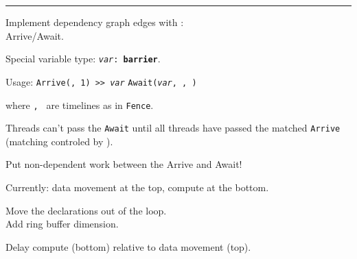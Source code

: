 \newpage
{}

{
\Large
\begin{tikzpicture}[node distance=0mm]





\end{tikzpicture}
}

\hrule

{\LARGE
Implement dependency graph edges with :\\Arrive/Await.
}

\newpage
{}

{\LARGE
Special variable type: \texttt{\textit{var}: \textbf{barrier}}.

Usage: \texttt{Arrive(, 1) >> \textit{var}} \hfill \texttt{Await(\textit{var}, , )}

where \texttt{, } are timelines as in \texttt{Fence}.

\hspace{5mm}

Threads can't pass the \texttt{Await} until all threads have passed the matched \texttt{Arrive} (matching controled by ).

\hspace{5mm}

Put non-dependent work between the Arrive and Await!

}

\newpage
{}

{\large

}

{\LARGE
Currently: data movement at the top, compute at the bottom.
}

\newpage
{}

{\large

}

{\LARGE
Move the  declarations out of the  loop.\\
Add ring buffer dimension.
}

\newpage
{}

{\large

}

{\LARGE
Delay compute (bottom) relative to data movement (top).
}

\newpage
{}

